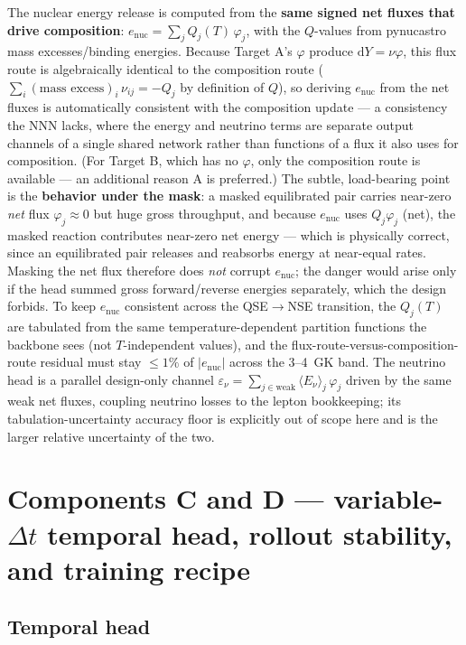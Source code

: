 \documentclass[11pt]{article}
\newcommand{\enuc}{e_{\mathrm{nuc}}}
\newcommand{\dd}{\mathrm{d}}
\begin{document}
The nuclear energy release is computed from the \textbf{same signed net fluxes that drive composition}: $\enuc = \sum_j Q_j(T)\,\varphi_j$, with the $Q$-values from pynucastro mass excesses/binding energies. Because Target A's $\varphi$ produce $\dd Y = \nu\varphi$, this flux route is algebraically identical to the composition route ($\sum_i (\text{mass excess})_i\,\nu_{ij} = -Q_j$ by definition of $Q$), so deriving $\enuc$ from the net fluxes is automatically consistent with the composition update --- a consistency the NNN lacks, where the energy and neutrino terms are separate output channels of a single shared network rather than functions of a flux it also uses for composition. (For Target B, which has no $\varphi$, only the composition route is available --- an additional reason A is preferred.) The subtle, load-bearing point is the \textbf{behavior under the mask}: a masked equilibrated pair carries near-zero \emph{net} flux $\varphi_j \approx 0$ but huge gross throughput, and because $\enuc$ uses $Q_j\varphi_j$ (net), the masked reaction contributes near-zero net energy --- which is physically correct, since an equilibrated pair releases and reabsorbs energy at near-equal rates. Masking the net flux therefore does \emph{not} corrupt $\enuc$; the danger would arise only if the head summed gross forward/reverse energies separately, which the design forbids. To keep $\enuc$ consistent across the QSE$\to$NSE transition, the $Q_j(T)$ are tabulated from the same temperature-dependent partition functions the backbone sees (not $T$-independent values), and the flux-route-versus-composition-route residual must stay $\le 1\%$ of $|\enuc|$ across the 3--4~GK band. The neutrino head is a parallel design-only channel $\varepsilon_\nu = \sum_{j\in\text{weak}} \langle E_\nu\rangle_j\,\varphi_j$ driven by the same weak net fluxes, coupling neutrino losses to the lepton bookkeeping; its tabulation-uncertainty accuracy floor is explicitly out of scope here and is the larger relative uncertainty of the two.

\section{Components C and D --- variable-\texorpdfstring{$\Delta t$}{dt} temporal head, rollout stability, and training recipe}

\subsection{Temporal head}
\end{document}
